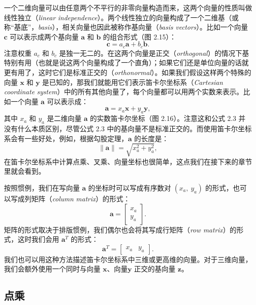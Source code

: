 一个二维向量可以由任意两个不平行的非零向量构造而来，这两个向量的性质叫做线性独立（\textit{linear independence}）。两个线性独立的向量构成了一个二维基（或称“基底”，\textit{basis}），相关向量也因此被称作基向量（\textit{basis vectors}）。比如一个向量 $\mathbf{c}$ 可以表示成两个基向量 $\mathbf{a}$ 和 $\mathbf{b}$ 的组合形式（图 2.15）：
\begin{equation}
  \mathbf{c} = a_c\mathbf{a} + b_c\mathbf{b}.
\end{equation}
注意权重 $a_c$ 和 $b_c$ 是独一无二的。在这两个向量是正交（\textit{orthogonal}）的情况下基特别有用（也就是说这两个向量构成了一个直角）；如果它们还是单位向量的话就更有用了，这时它们是标准正交的（\textit{orthonormal}）。如果我们假设这样两个特殊的向量 $\mathbf{x}$ 和 $\mathbf{y}$ 是已知的，那我们就能用它们表示笛卡尔坐标系（\textit{Cartesian coordinate system}）中的所有其他向量了，每个向量都可以用两个实数来表示。比如一个向量 $\mathbf{a}$ 可以表示成：
\[
  \mathbf{a} = x_a\mathbf{x} + y_a\mathbf{y},
\]
其中 $x_a$ 和 $y_a$ 是二维向量 $\mathbf{a}$ 的实数笛卡尔坐标（图 2.16）。注意这和公式 2.3 并没有什么本质区别，尽管公式 2.3 中的基向量不是标准正交的。而使用笛卡尔坐标系会有一些好处，例如，根据勾股定理，$\mathbf{a}$ 的长度是：
\[
  \| \mathbf{a} \| = \sqrt{x_a^2 + y_a^2},
\]
在笛卡尔坐标系中计算点乘、叉乘、向量坐标也很简单，这点我们在接下来的章节里就会看到。

按照惯例，我们在写向量 $\mathbf{a}$ 的坐标时可以写成有序数对 $(x_a,\ y_a)$ 的形式，也可以写成列矩阵（\textit{column matrix}）的形式：
\[
  \mathbf{a} = \begin{bmatrix}
    x_a \\
    y_a
  \end{bmatrix}.
\]
矩阵的形式取决于排版惯例，我们偶尔也会将其写成行矩阵（\textit{row matrix}）的形式，这时我们会用 $\mathbf{a}^T$ 的形式：
\[
  \mathbf{a}^T = \begin{bmatrix}
    x_a & y_a
  \end{bmatrix}.
\]
我们也可以用这种方法描述笛卡尔坐标系中三维或更高维的向量。对于三维向量，我们会额外使用一个同时与向量 $\mathbf{x}$、向量$\mathbf{y}$ 正交的基向量 $\mathbf{z}$。

\subsection{点乘}

